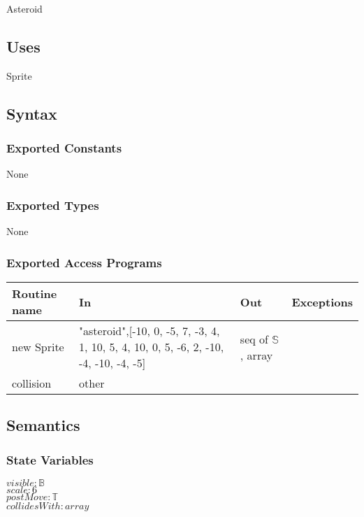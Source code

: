 \documentclass[12pt]{article}
\begin{document}
Asteroid

\subsection* {Uses}

Sprite

\subsection* {Syntax}

\subsubsection* {Exported Constants}

None

\subsubsection* {Exported Types}

None 

\subsubsection* {Exported Access Programs}

\begin{tabular}{| l | l | l | p{5cm} |}
\hline
\textbf{Routine name} & \textbf{In} & \textbf{Out} & \textbf{Exceptions}\\
\hline
new Sprite & "asteroid",[-10,   0,
              -5,   7,
              -3,   4,
               1,  10,
               5,   4,
              10,   0,
               5,  -6,
               2, -10,
              -4, -10,
              -4,  -5]  & seq of $\mathbb{S}$, array & ~\\
\hline
collision & other & ~ & ~\\

\end{tabular}
\subsection* {Semantics}

\subsubsection* {State Variables}


$visible: \mathbb{B}$\\
$scale: 6$\\
$postMove: \mathbb{T}$\\
$collidesWith: array$\\
\end{document}
